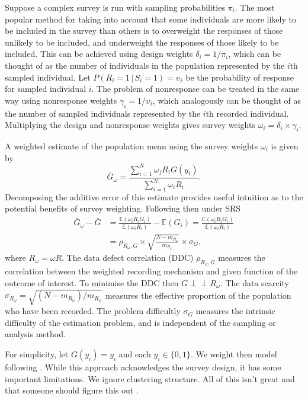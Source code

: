 \documentclass[a4paper, nobind]{templates/ociamthesis}
\begin{document}
Suppose a complex survey is run with sampling probabilities \(\pi_i\).
The most popular method for taking into account that some individuals are more likely to be included in the survey than others is to overweight the responses of those unlikely to be included, and underweight the responses of those likely to be included.
This can be achieved using design weights \(\delta_i = 1 / \pi_i\), which can be thought of as the number of individuals in the population represented by the \(i\)th sampled individual.
Let \(P(R_i = 1 \, | \, S_i = 1) = \upsilon_i\) be the probability of response for sampled individual \(i\).
The problem of nonresponse can be treated in the same way using nonresponse weights \(\gamma_i = 1 / \upsilon_i\), which analogously can be thought of as the number of sampled individuals represented by the \(i\)th recorded individual.
Multiplying the design and nonresponse weights gives survey weights \(\omega_i = \delta_i \times \gamma_i\).

A weighted estimate \autocite{hajek1971discussion} of the population mean using the survey weights \(\omega_i\) is given by
\begin{equation}
\bar G_\omega = \frac{\sum_{i = 1}^N \omega_j R_i G(y_i)}{\sum_{i = 1}^N \omega_i R_i}. \label{eq:hajek}
\end{equation}
Decomposing the additive error of this estimate provides useful intuition as to the potential benefits of survey weighting.
Following \textcite{meng2018statistical} then under SRS
\begin{align}
\bar G_\omega - \bar G &= \frac{\mathbb{E}(\omega_i R_i G_i)}{\mathbb{E}(\omega_i R_i)} - \mathbb{E}(G_i) = \frac{\mathbb{C}(\omega_i R_i G_i)}{\mathbb{E}(\omega_i R_i)} \\ 
&= \rho_{R_\omega, G} \times \sqrt{\frac{N - m_{R_\omega}}{m_{R_\omega}}} \times \sigma_G,
\end{align}
where \(R_\omega = \omega R\).
The data defect correlation (DDC) \(\rho_{R_\omega, G}\) measures the correlation between the weighted recording mechanism and given function of the outcome of interest.
To minimise the DDC then \(G \perp \!\!\! \perp R_\omega\).
The data scarcity \(\sigma_{R_\omega} = \sqrt{(N - m_{R_\omega})/m_{R_\omega}}\) measures the effective proportion of the population who have been recorded.
The problem difficultly \(\sigma_G\) measures the intrinsic difficulty of the estimation problem, and is independent of the sampling or analysis method.

For simplicity, let \(G(y_i) = y_i\) and each \(y_i \in \{0, 1\}\).
We weight then model following \textcite{chen2014use}.
While this approach acknowledges the survey design, it has some important limitations.
We ignore clustering structure.
All of this isn't great and that someone should figure this out \autocite{gelman2007struggles}.
\end{document}
